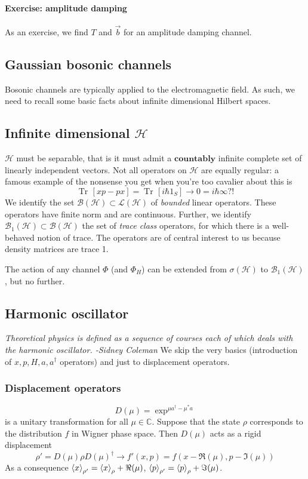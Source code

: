\documentclass[a4paper, 11pt]{article}
\newcommand{\Tr}{\mathop{\mathrm{Tr}\!}{}}
\newcommand{\HH}{\mathcal{H}}
\begin{document}
	\paragraph{Exercise: amplitude damping} As an exercise, we find $T$ and $\vec{b}$ for an amplitude damping channel.
	
	\subsection{Gaussian bosonic channels}
	Bosonic channels are typically applied to the electromagnetic field. As such, we need to recall some basic facts about infinite dimensional Hilbert spaces.
	\subsection{Infinite dimensional $\HH$}
	$\HH$ must be separable, that is it must admit a $\mathbf{countably}$ infinite complete set of linearly independent vectors.
	Not all operators on $\HH$ are equally regular: a famous example of the nonsense you get when you're too cavalier about this is
	\[ \Tr\left[ xp - px \right] = \Tr\left[ i\hbar 1_S \right] \rightarrow 0 = i\hbar\infty?! \]
	We identify the set $\mathcal{B}(\HH) \subset \mathcal{L}(\HH)$ of \emph{bounded} linear operators. These operators have finite norm and are continuous. Further, we identify $\mathcal{B}_1(\HH) \subset \mathcal{B}(\HH)$ the set of \emph{trace class} operators, for which there is a well-behaved notion of trace. The operators are of central interest to us because density matrices are trace 1.
	
	The action of any channel $\Phi$ (and $\Phi_H$) can be extended from $\sigma(\HH)$ to $\mathcal{B}_1(\HH)$, but no further.
	
	\subsection{Harmonic oscillator}
	\emph{Theoretical physics is defined as a sequence of courses each of which deals with the harmonic oscillator. -Sidney Coleman}
	We skip the very basics (introduction of $x,p,H,a,a^\dagger$ operators) and just to displacement operators.
	\subsubsection{Displacement operators}
	\[ D(\mu) = \exp^{\mu a^\dagger - \mu^* a} \]
	is a unitary transformation for all $\mu \in \mathbb{C}$. Suppose that the state $\rho$ corresponds to the distribution $f$ in Wigner phase space. Then $D(\mu)$ acts as a rigid displacement
	\[ \rho' = D(\mu) \rho D(\mu)^\dagger \rightarrow f'(x,p) = f(x-\Re(\mu), p-\Im(\mu)) \]
	As a consequence $\braket{x}_{\rho'} = \braket{x}_\rho + \Re(\mu)$, $\braket{p}_{\rho'} = \braket{p}_\rho + \Im(\mu)$.
	
\end{document}
